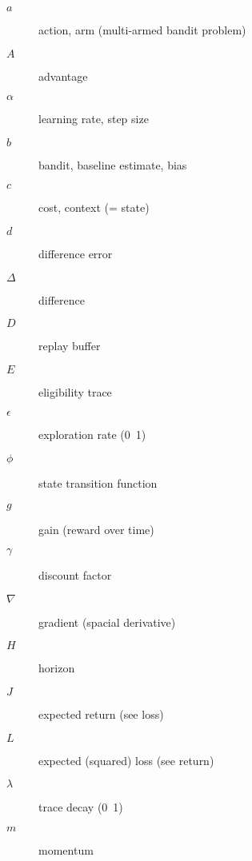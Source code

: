 \documentclass[10pt,landscape]{article}
\begin{document}
\begin{multicols}{3}
\begin{description}
    \item[$a$]
    action, arm (multi-armed bandit problem)
    \item[$A$]
    advantage
    \item[$\alpha$]
    learning rate, step size
    \item[$b$]
    bandit, baseline estimate, bias
    \item[$c$]
    cost, context (= state)
    \item[$d$]
    difference error
    \item[$\Delta$]
    difference
    \item[$D$]
    replay buffer
    \item[$E$]
    eligibility trace %
    \item[$\epsilon$]
    exploration rate (0~1)
    \item[$\phi$]
    state transition function
    \item[$g$]
    gain (reward over time) %
    \item[$\gamma$]
    discount factor
    \item[$\nabla$]
    gradient (spacial derivative)
    \item[$H$]
    horizon
    \item[$J$]
    expected return (see loss)
    \item[$L$]
    expected (squared) loss (see return)
    \item[$\lambda$]
    trace decay (0~1)
    \item[$m$]
    momentum %

\end{description}
\end{multicols}
\end{document}

